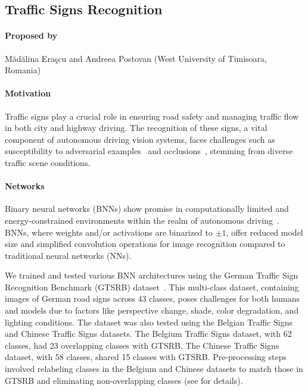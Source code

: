 \documentclass[oneside,11pt,dvipsnames]{book}
\begin{document}
\subsection{Traffic Signs Recognition}
\paragraph*{Proposed by} M\u{a}d\u{a}lina Era\c{s}cu and Andreea Postovan (West University of Timisoara, Romania)
\paragraph*{Motivation} Traffic signs play a crucial role in ensuring road safety and managing traffic flow in both city and highway driving. The recognition of these signs, a vital component of autonomous driving vision systems, faces challenges such as susceptibility to adversarial examples~\cite{szegedy2013intriguing} and occlusions~\cite{zhang2020lightweight}, stemming from diverse traffic scene conditions.

\paragraph*{Networks} Binary neural networks (BNNs) show promise in computationally limited and energy-constrained environments within the realm of autonomous driving~\cite{hubara2016binarized}. BNNs, where weights and/or activations are binarized to $\pm 1$, offer reduced model size and simplified convolution operations for image recognition compared to traditional neural networks (NNs).

We trained and tested various BNN architectures using the German Traffic Sign Recognition Benchmark (GTSRB) dataset~\cite{GTSRB}. This multi-class dataset, containing images of German road signs across 43 classes, poses challenges for both humans and models due to factors like perspective change, shade, color degradation, and lighting conditions. The dataset was also tested using the Belgian Traffic Signs \cite{BelgianTrafficSignDatabase} and Chinese Traffic Signs \cite{ChineseTrafficSignDatabase} datasets. The Belgium Traffic Signs dataset, with 62 classes, had 23 overlapping classes with GTSRB. The Chinese Traffic Signs dataset, with 58 classes, shared 15 classes with GTSRB. Pre-processing steps involved relabeling classes in the Belgium and Chinese datasets to match those in GTSRB and eliminating non-overlapping classes (see \cite{postovan2023architecturing} for details).
\end{document}
